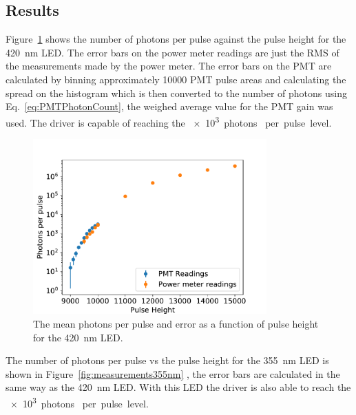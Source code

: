 \documentclass[11pt, a4paper, oneside ]{article}
\begin{document}
\subsection{Results}
Figure~\ref{fig:measurements420nm} shows the number of photons per pulse against the pulse height for the \SI{420}{nm} LED. The error bars on the power meter readings are just the RMS of the measurements made by the power meter. The error bars on the PMT are calculated by binning approximately 10000 PMT pulse areas and calculating the spread on the histogram which is then converted to the number of photons using Eq.~\ref{eq:PMTPhotonCount}, the weighed average value for the PMT gain was used. The driver is capable of reaching the \SI{e3}{photons } per pulse level.

\begin{figure}[H]
    \centering
    \includegraphics[width=0.8\textwidth]{figures/PhotonCounts420nm.pdf}
    \caption{The mean photons per pulse and error as a function of pulse height for the \SI{420}{nm} LED.}
    \label{fig:measurements420nm}
\end{figure}

The number of photons per pulse vs the pulse height for the \SI{355}{nm} LED is shown in Figure~\ref{fig:measurements355nm} , the error bars are calculated in the same way as the \SI{420}{nm} LED. With this LED the driver is also able to reach the \SI{e3}{photons } per pulse level.
\end{document}
